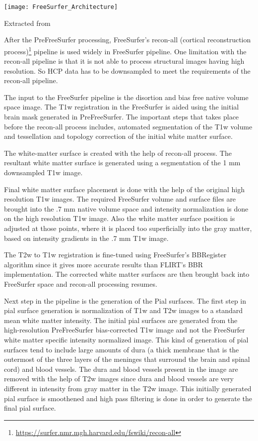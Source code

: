 \begin{center}
  \texttt{[image: FreeSurfer\_Architecture]}
  \label{fig:freesurfer_overview}
  \caption*{Extracted from \cite{Gla13}}
\end{center}

After the PreFreeSurfer processing, FreeSurfer's recon-all (cortical reconstruction process)\footnote{\url{https://surfer.nmr.mgh.harvard.edu/fswiki/recon-all}} pipeline is used widely in FreeSurfer pipeline. One limitation with the recon-all pipeline is that it is not able to process structural images having high resolution. So HCP data has to be downsampled to meet the requirements of the recon-all pipeline.

The input to the FreeSurfer pipeline is the disortion and bias free native volume space image. The T1w registration in the FreeSurfer is aided using the initial brain mask generated in PreFreeSurfer. The important steps that takes place before the recon-all process includes, automated segmentation of the T1w volume and tessellation and topology correction of the initial white matter surface. 

The white-matter surface is created with the help of recon-all process. The resultant white matter surface is generated using a segmentation of the 1 mm downsampled T1w image.

Final white matter surface placement is done with the help of the original high resolution T1w images. The required FreeSurfer volume and surface files are brought into the .7 mm native volume space and intensity normalization is done on the high resolution T1w image. Also the white matter surface position is adjusted at those points, where it is placed too superficially into the gray matter, based on intensity gradients in the .7 mm T1w image.

The T2w to T1w registration is fine-tuned using FreeSurfer's BBRegister algorithm since it gives more accurate results than FLIRT's BBR implementation. The corrected white matter surfaces are then brought back into FreeSurfer space and recon-all processing resumes.

Next step in the pipeline is the generation of the Pial surfaces. The first step in pial surface generation is normalization of T1w and T2w images to a standard mean white matter intensity. The initial pial surfaces are generated from the high-resolution PreFreeSurfer bias-corrected T1w image and not the FreeSurfer white matter specific intensity normalized image. This kind of generation of pial surfaces tend to include large amounts of dura (a thick membrane that is the outermost of the three layers of the meninges that surround the brain and spinal cord) and blood vessels. The dura and blood vessels present in the image are removed with the help of T2w images since dura and blood vessels are very different in intensity from gray matter in the T2w image. This initially generated pial surface is smoothened and high pass filtering is done in order to generate the final pial surface.

